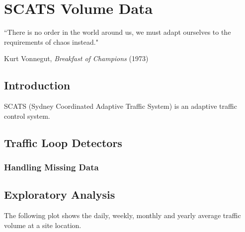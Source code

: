 
\chapter{SCATS Volume Data} %

\label{Chapter3}


``There is no order in the world around us, we must adapt ourselves to the requirements of chaos
instead."

\begin{flushright}
Kurt Vonnegut, \textit{Breakfast of Champions} (1973)
\end{flushright}


\section{Introduction}
SCATS (Sydney Coordinated Adaptive Traffic System) is an adaptive traffic control system.

\section{Traffic Loop Detectors}

\subsection{Handling Missing Data}


\section{Exploratory Analysis}
The following plot shows the daily, weekly, monthly and yearly average traffic volume at a site location.

